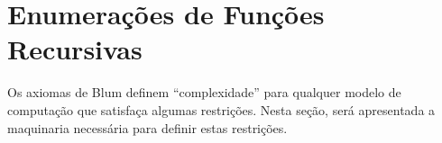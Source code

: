 \section{Enumerações de Funções Recursivas}

Os axiomas de Blum definem ``complexidade''
para qualquer modelo de computação que satisfaça algumas restrições.
Nesta seção,
será apresentada a maquinaria necessária para definir estas restrições.
